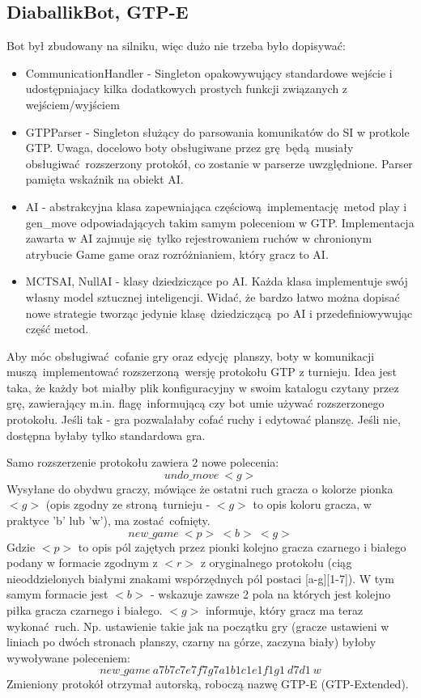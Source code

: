 \documentclass[a4paper,12pt]{article}
\begin{document}
\subsection*{DiaballikBot, GTP-E}
Bot był zbudowany na silniku, więc dużo nie trzeba było dopisywać:
\begin{itemize}
 \item CommunicationHandler - Singleton opakowywujący standardowe wejście i udostępniajacy kilka dodatkowych prostych funkcji związanych z 
 wejściem/wyjściem
 \item GTPParser - Singleton służący do parsowania komunikatów do SI w protkole GTP. Uwaga, docelowo boty obsługiwane przez grę będą musiały
 obsługiwać rozszerzony protokół, co zostanie w parserze uwzględnione. Parser pamięta wskaźnik na obiekt AI.
 \item AI - abstrakcyjna klasa zapewniająca częściową implementację metod play i gen\_move odpowiadających takim samym poleceniom w GTP. Implementacja
 zawarta w AI zajmuje się tylko rejestrowaniem ruchów w chronionym atrybucie Game game oraz rozróżnianiem, który gracz to AI.
 \item MCTSAI, NullAI - klasy dziedziczące po AI. Każda klasa implementuje swój własny model sztucznej inteligencji. Widać, że bardzo łatwo można
 dopisać nowe strategie tworząc jedynie klasę dziedziczącą po AI i przedefiniowywując część metod.
\end{itemize}
Aby móc obsługiwać cofanie gry oraz edycję planszy, boty w komunikacji muszą implementować rozszerzoną wersję protokołu GTP z turnieju. Idea jest
taka, że każdy bot miałby plik konfiguracyjny w swoim katalogu czytany przez grę, zawierający m.in. flagę informującą czy bot umie używać rozszerzonego
protokołu. Jeśli tak - gra pozwalałaby cofać ruchy i edytować planszę. Jeśli nie, dostępna byłaby tylko standardowa gra.

Samo rozszerzenie protokołu zawiera 2 nowe polecenia:
\[undo\_move ~ <g>\]
Wysyłane do obydwu graczy, mówiące że ostatni ruch gracza o kolorze pionka $<g>$ (opis zgodny ze stroną turnieju - $<g>$ to opis koloru gracza, w 
praktyce 'b' lub 'w'), ma zostać cofnięty.
\[new\_game ~ <p> ~ <b>  ~ <g>\]
Gdzie $<p>$ to opis pól zajętych przez pionki kolejno gracza czarnego i białego podany w formacie zgodnym z $<r>$ z oryginalnego protokołu (ciąg
nieoddzielonych białymi znakami wspórzędnych pól postaci [a-g][1-7]). W tym samym formacie jest $<b>$ - wskazuje zawsze 2 pola na których jest kolejno
piłka gracza czarnego i białego. $<g>$ informuje, który gracz ma teraz wykonać ruch. Np. ustawienie takie jak na początku gry (gracze ustawieni w
liniach po dwóch stronach planszy, czarny na górze, zaczyna biały) byłoby wywoływane poleceniem:
\[new\_game ~ a7b7c7e7f7g7a1b1c1e1f1g1 ~ d7d1 ~ w\]
Zmieniony protokół otrzymał autorską, roboczą nazwę GTP-E (GTP-Extended).
\subsection*{}
\end{document}
